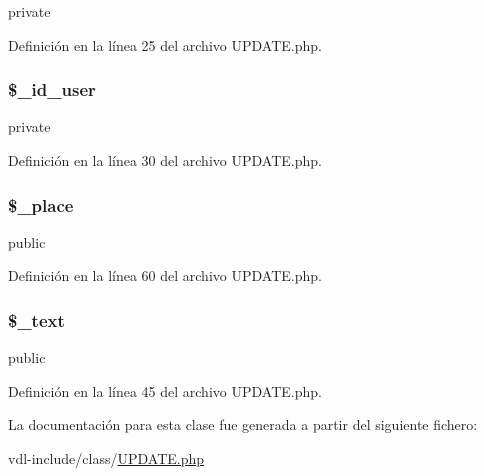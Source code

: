 private 

Definición en la línea 25 del archivo U\-P\-D\-A\-T\-E.\-php.

\hypertarget{classUPDATE_a09e313c6ebd36278e3777f8461c124a5}{
\subsubsection[{\$\-\_\-id\-\_\-user}]{\setlength{\rightskip}{0pt plus 5cm}\$\-\_\-id\-\_\-user\hspace{0.3cm}{\ttfamily [private]}}}\label{classUPDATE_a09e313c6ebd36278e3777f8461c124a5}
private 

Definición en la línea 30 del archivo U\-P\-D\-A\-T\-E.\-php.

\hypertarget{classUPDATE_a7c2710f8add9b3b64b8f85f8d06d3687}{
\subsubsection[{\$\-\_\-place}]{\setlength{\rightskip}{0pt plus 5cm}\$\-\_\-place}}\label{classUPDATE_a7c2710f8add9b3b64b8f85f8d06d3687}
public 

Definición en la línea 60 del archivo U\-P\-D\-A\-T\-E.\-php.

\hypertarget{classUPDATE_a30dbc932171e87783bf0630dcdb5ad36}{
\subsubsection[{\$\-\_\-text}]{\setlength{\rightskip}{0pt plus 5cm}\$\-\_\-text}}\label{classUPDATE_a30dbc932171e87783bf0630dcdb5ad36}
public 

Definición en la línea 45 del archivo U\-P\-D\-A\-T\-E.\-php.



La documentación para esta clase fue generada a partir del siguiente fichero\-:\begin{DoxyCompactItemize}
\item 
vdl-\/include/class/\hyperlink{vdl-include_2class_2update_8php}{U\-P\-D\-A\-T\-E.\-php}\end{DoxyCompactItemize}
